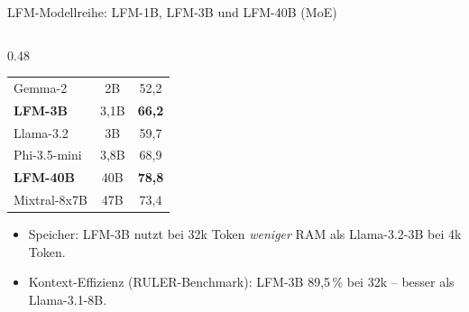 \documentclass[aspectratio=1610, xcolor=dvipsnames, 9pt]{beamer}
\begin{document}
\begin{frame}{LFM-Modellreihe: LFM-1B, LFM-3B und LFM-40B (MoE)}
\begin{columns}
\begin{column}{0.48\textwidth}
\begin{tabular}{@{}lcc@{}}
        Gemma-2              & 2B   & 52,2 \\[2pt]
        \textbf{LFM-3B}      & 3,1B & \textbf{66,2} \\
        Llama-3.2            & 3B   & 59,7 \\
        Phi-3.5-mini         & 3,8B & 68,9 \\[2pt]
        \textbf{LFM-40B}     & 40B  & \textbf{78,8} \\
        Mixtral-8x7B         & 47B  & 73,4 \\
        \hline
      \end{tabular}
      \vspace{0.3cm}
      \begin{itemize}\scriptsize
        \item Speicher: LFM-3B nutzt bei 32k Token \emph{weniger} RAM als Llama-3.2-3B bei 4k Token.
        \item Kontext-Effizienz (RULER-Benchmark): LFM-3B 89,5\,\% bei 32k -- besser als Llama-3.1-8B.
      \end{itemize}
    \end{column}
  \end{columns}
\end{frame}
\end{document}
